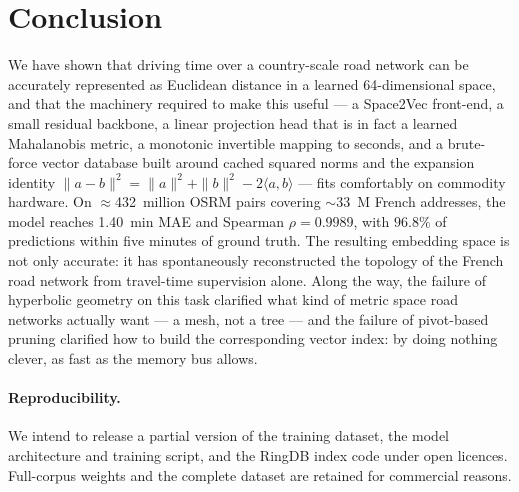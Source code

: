 \documentclass[11pt,a4paper]{article}
\begin{document}
\section{Conclusion}

We have shown that driving time over a country-scale road network
can be accurately represented as Euclidean distance in a learned
64-dimensional space, and that the machinery required to make this
useful --- a Space2Vec front-end, a small residual backbone, a
linear projection head that is in fact a learned Mahalanobis metric,
a monotonic invertible mapping to seconds, and a brute-force vector
database built around cached squared norms and the expansion
identity $\|a-b\|^{2} = \|a\|^{2} + \|b\|^{2} - 2\langle a,b\rangle$
--- fits comfortably on commodity hardware. On $\approx$432~million
OSRM pairs covering $\sim$33~M French addresses, the model reaches
1.40~min MAE and Spearman $\rho = 0.9989$, with $96.8\%$ of
predictions within five minutes of ground truth. The resulting
embedding space is not only accurate: it has spontaneously
reconstructed the topology of the French road network from
travel-time supervision alone. Along the way, the failure of
hyperbolic geometry on this task clarified what kind of metric
space road networks actually want --- a mesh, not a tree --- and
the failure of pivot-based pruning clarified how to build the
corresponding vector index: by doing nothing clever, as fast as the
memory bus allows.

\paragraph{Reproducibility.}
We intend to release a partial version of the training dataset, the
model architecture and training script, and the RingDB index code
under open licences. Full-corpus weights and the complete dataset
are retained for commercial reasons.



\end{document}
